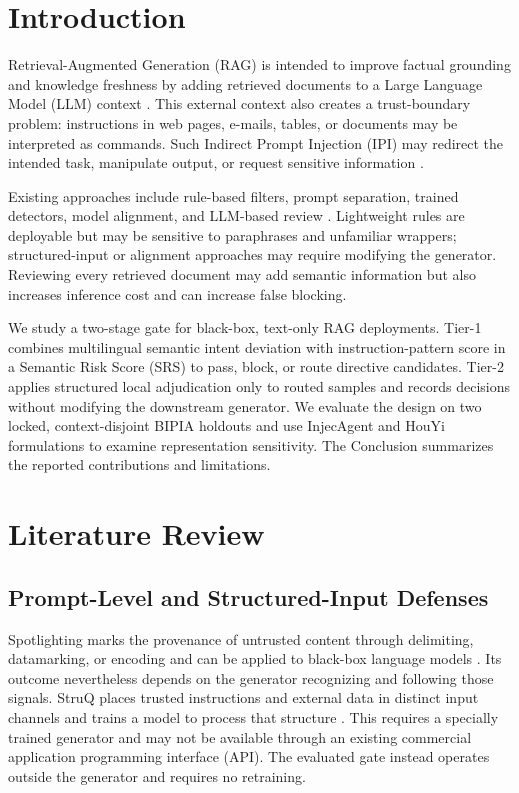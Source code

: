 \documentclass[conference,a4paper]{IEEEtran}
\begin{document}
\section{Introduction}
Retrieval-Augmented Generation (RAG) is intended to improve factual grounding and knowledge freshness by adding retrieved documents to a Large Language Model (LLM) context \cite{b2,b3}. This external context also creates a trust-boundary problem: instructions in web pages, e-mails, tables, or documents may be interpreted as commands. Such Indirect Prompt Injection (IPI) may redirect the intended task, manipulate output, or request sensitive information \cite{b4,b5}.

Existing approaches include rule-based filters, prompt separation, trained detectors, model alignment, and LLM-based review \cite{b5,b6}. Lightweight rules are deployable but may be sensitive to paraphrases and unfamiliar wrappers; structured-input or alignment approaches may require modifying the generator. Reviewing every retrieved document may add semantic information but also increases inference cost and can increase false blocking.

We study a two-stage gate for black-box, text-only RAG deployments. Tier-1 combines multilingual semantic intent deviation with instruction-pattern score in a Semantic Risk Score (SRS) to pass, block, or route directive candidates. Tier-2 applies structured local adjudication only to routed samples and records decisions without modifying the downstream generator. We evaluate the design on two locked, context-disjoint BIPIA holdouts \cite{b6} and use InjecAgent and HouYi formulations to examine representation sensitivity. The Conclusion summarizes the reported contributions and limitations.

\section{Literature Review}
\subsection{Prompt-Level and Structured-Input Defenses}
Spotlighting marks the provenance of untrusted content through delimiting, datamarking, or encoding and can be applied to black-box language models \cite{b7}. Its outcome nevertheless depends on the generator recognizing and following those signals. StruQ places trusted instructions and external data in distinct input channels and trains a model to process that structure \cite{b8}. This requires a specially trained generator and may not be available through an existing commercial application programming interface (API). The evaluated gate instead operates outside the generator and requires no retraining.
\end{document}
